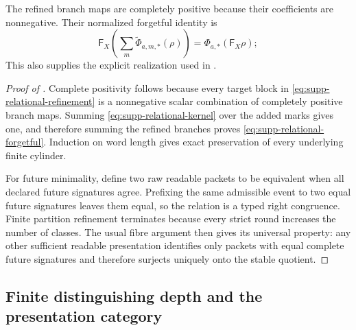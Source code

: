 \documentclass[11pt]{article}
\numberwithin{equation}{section}
\theoremstyle{definition}
\theoremstyle{remark}
\begin{document}
The refined branch maps are completely positive because their coefficients
are nonnegative. Their normalized forgetful identity is
\begin{equation}
       \mathsf F_X\!\left(\sum_m\widetilde\Phi_{a,m,*}(\rho)\right)
       =\Phi_{a,*}(\mathsf F_X\rho);
       \label{eq:supp-relational-forgetful}
      \end{equation}
This also supplies the explicit realization used in
.


\begin{proof}[Proof of ]
Complete positivity follows because every target block in
\eqref{eq:supp-relational-refinement} is a nonnegative scalar combination of
completely positive branch maps.  Summing
\eqref{eq:supp-relational-kernel} over the added marks gives one, and therefore
summing the refined branches proves
\eqref{eq:supp-relational-forgetful}.  Induction on word length gives exact
preservation of every underlying finite cylinder.

For future minimality, define two raw readable packets to be equivalent when
all declared future signatures agree.  Prefixing the same admissible event to
two equal future signatures leaves them equal, so the relation is a typed
right congruence.  Finite partition refinement terminates because every strict
round increases the number of classes.  The usual fibre argument then gives
its universal property: any other sufficient readable presentation identifies
only packets with equal complete future signatures and therefore surjects
uniquely onto the stable quotient.
\end{proof}


\subsection{Finite distinguishing depth and the presentation category}
\end{document}
